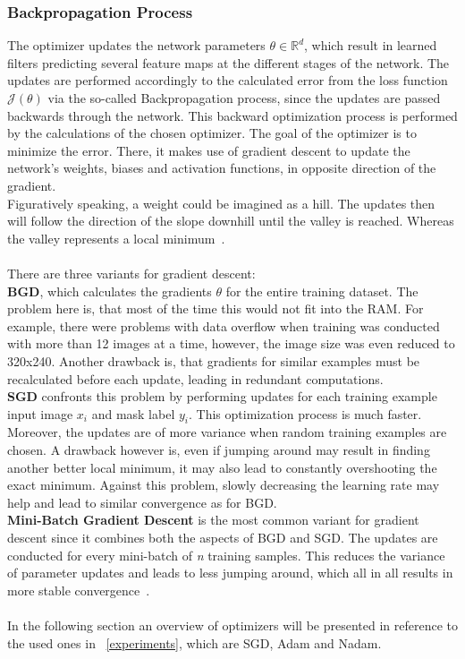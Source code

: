 \subsubsection{Backpropagation Process}
The optimizer updates the network parameters $\theta \in \mathbb{R}^d$, which result in learned filters predicting several feature maps at
the different stages of the network.
The updates are performed accordingly to the calculated error from the loss function $\mathcal{J}(\theta)$ via the
so-called Backpropagation process, since the updates are passed backwards through the network.
This backward optimization process is performed by the calculations of the chosen optimizer.
The goal of the optimizer is to minimize the error.
There, it makes use of gradient descent to update the network's weights, biases and activation functions, in opposite direction
of the gradient.\\
Figuratively speaking, a weight could be imagined as a hill.
The updates then will follow the direction of the slope downhill until the valley is reached.
Whereas the valley represents a local minimum~\cite{optimizersoverview}.
\\\mbox{}\\
There are three variants for gradient descent:\\
\textbf{\gls{BGD}}, which calculates the gradients $\theta$ for the entire training dataset.
The problem here is, that most of the time this would not fit into the RAM.
For example, there were problems with data overflow when training was conducted with more than 12 images at a time, however, the image size was even reduced
to 320x240.
Another drawback is, that gradients for similar examples must be recalculated before each update, leading in redundant computations.\\
\textbf{\gls{SGD}} confronts this problem by performing updates for each training example input image $x_i$
and mask label $y_i$.
This optimization process is much faster.
Moreover, the updates are of more variance when random training examples are chosen.
A drawback however is, even if jumping around may result in finding another better local minimum, it may also
lead to constantly overshooting the exact minimum.
Against this problem, slowly decreasing the learning rate may help and lead to similar convergence as for BGD.\\
\textbf{Mini-Batch Gradient Descent} is the most common variant for gradient descent since it combines both the aspects of
\gls{BGD} and \gls{SGD}.
The updates are conducted for every mini-batch of \textit{n} training samples.
This reduces the variance of parameter updates and leads to less jumping around, which all in all results in more stable
convergence~\cite{optimizersoverview}.
\\\mbox{}\\
In the following section an overview of optimizers will be presented in reference to the used ones in ~\autoref{experiments}, which are
\gls{SGD}, \gls{Adam} and \gls{Nadam}.


